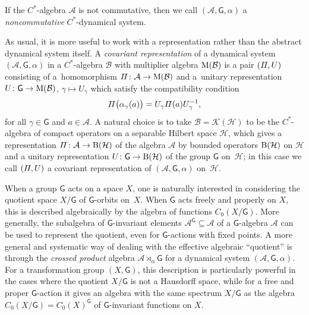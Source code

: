 \documentclass[pdftex]{sigma}
\numberwithin{equation}{section}
\newcommand{\CK}{\mathcal{K}}
\newcommand{\sfG}{\mathsf{G}}
\newcommand{\Pim}{{\mit\Pi}}
\def\alg{{\mathcal A}}
\def\balg{{\mathcal B}}
\def\hil{{\mathcal H}}
\begin{document}
If the $C^*$-algebra $\alg$ is not commutative, then we call
$(\alg,\sfG,\alpha)$ a \emph{noncommutative} $C^*$-dynamical system.

As usual, it is more useful to work with a representation rather than the
abstract dynamical system itself. A \emph{covariant representation} of
a dynamical system $(\alg,\sfG,\alpha)$ in a $C^*$-algebra $\balg$ with
multiplier algebra ${\rm M}(\balg)$ is a
pair $(\Pim,U)$ consisting of a~homomorphism $\Pim\colon \alg\to {\rm M}(\balg)$ and a~unitary representation $U\colon \sfG\to{\rm M}(\balg)$, $\gamma\mapsto U_\gamma$ which satisfy the compatibility condition
\[
\Pim\big(\alpha_\gamma(a)\big) = U_\gamma \Pim(a) U_\gamma^{-1} ,
\]
for all $\gamma\in \sfG$ and $a\in\alg$. A natural choice is to take
$\balg=\CK(\hil)$ to be the $C^*$-algebra of compact operators on a
separable Hilbert space $\hil$, which gives a
representation $\Pim\colon \alg\to{\rm B}(\hil)$ of the algebra $\alg$ by
bounded operators ${\rm B}(\hil)$ on $\hil$ and a unitary representation
$U\colon \sfG\to{\rm B}(\hil)$ of the group $\sfG$ on~$\hil$; in this case
we call $(\Pim,U)$ a covariant representation of $(\alg,\sfG,\alpha)$ on~$\hil$.

When a group $\sfG$ acts on a space $X$, one is naturally interested
in considering the
quotient space $X/\sfG$ of $\sfG$-orbits on~$X$. When $\sfG$ acts
freely and properly on
$X$, this is described algebraically by the algebra of functions
$C_0(X/\sfG)$. More generally, the subalgebra of $\sfG$-invariant elements
$\alg^\sfG\subseteq\alg$ of a $\sfG$-algebra $\alg$ can be used to represent the quotient, even for
$\sfG$-actions with fixed points. A more general and systematic way of
dealing with the effective algebraic ``quotient'' is through the
\emph{crossed product} algebra $\alg\rtimes_\alpha \sfG$ for a dynamical
system $(\alg,\sfG,\alpha)$. For a transformation group $(X,\sfG)$,
this description is particularly powerful in the cases where the
quotient $X/\sfG$ is not a Hausdorff space, while for a free and proper
$\sfG$-action it gives an algebra with the same spectrum $X/\sfG$
as the algebra $C_0(X/\sfG)=C_0(X)^\sfG$ of
$\sfG$-invariant functions on $X$.
\end{document}
